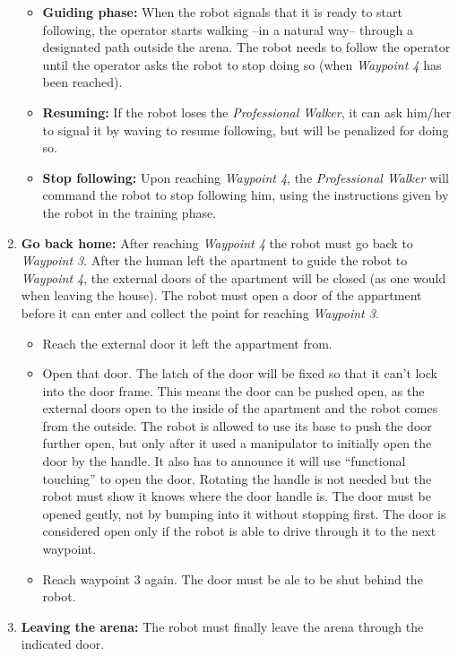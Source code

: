 \begin{enumerate}
\begin{itemize}
		\item \textbf{Guiding phase:} When the robot signals that it is ready to start following, the operator starts walking --in a natural way-- through a designated path outside the arena. The robot needs to follow the operator until the operator asks the robot to stop doing so (when \textit{Waypoint 4} has been reached).

		\item \textbf{Resuming:} If the robot loses the \textit{Professional Walker}, it can ask him/her to signal it by waving to resume following, but will be penalized for doing so.

		\item \textbf{Stop following:} Upon reaching \textit{Waypoint 4}, the \textit{Professional Walker} will command the robot to stop following him, using the instructions given by the robot in the training phase.
	\end{itemize}
	
	\item \textbf{Go back home:} After reaching \textit{Waypoint 4} the robot must go back to \textit{Waypoint 3}.
	  After the human left the apartment to guide the robot to \textit{Waypoint 4}, the external doors of the apartment will be closed (as one would when leaving the house). 
	  The robot must open a door of the appartment before it can enter and collect the point for reaching \textit{Waypoint 3}. 
	  \begin{itemize}
	    \item Reach the external door it left the appartment from.
	    \item Open that door. The latch of the door will be fixed so that it can't lock into the door frame.
	      This means the door can be pushed open, as the external doors open to the inside of the apartment and the robot comes from the outside. 
	      The robot is allowed to use its base to push the door further open, but only after it used a manipulator to initially open the door by the handle.
	      It also has to announce it will use ``functional touching'' to open the door. 
	      Rotating the handle is not needed but the robot must show it knows where the door handle is. 
	      The door must be opened gently, not by bumping into it without stopping first.
	      The door is considered open only if the robot is able to drive through it to the next waypoint. 
	    \item Reach waypoint 3 again. The door must be ale to be shut behind the robot. 
	  \end{itemize}
	
	\item \textbf{Leaving the arena:} The robot must finally leave the arena through the indicated door.
\end{enumerate}

